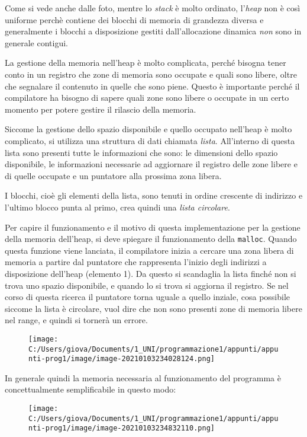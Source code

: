 \documentclass[
]{article}
\begin{document}
Come si vede anche dalle foto, mentre lo \emph{stack} è molto ordinato,
l'\emph{heap} non è così uniforme perchè contiene dei blocchi di memoria
di grandezza diversa e generalmente i blocchi a disposizione gestiti
dall'allocazione dinamica \emph{non} sono in generale contigui.

La gestione della memoria nell'heap è molto complicata, perché bisogna
tener conto in un registro che zone di memoria sono occupate e quali
sono libere, oltre che segnalare il contenuto in quelle che sono piene.
Questo è importante perché il compilatore ha bisogno di sapere quali
zone sono libere o occupate in un certo momento per potere gestire il
rilascio della memoria.

Siccome la gestione dello spazio disponibile e quello occupato nell'heap
è molto complicato, si utilizza una struttura di dati chiamata
\emph{lista}. All'interno di questa lista sono presenti tutte le
informazioni che sono: le dimensioni dello spazio disponibile, le
informazioni necessarie ad aggiornare il registro delle zone libere e di
quelle occupate e un puntatore alla prossima zona libera.

I blocchi, cioè gli elementi della lista, sono tenuti in ordine
crescente di indirizzo e l'ultimo blocco punta al primo, crea quindi una
\emph{lista circolare}.

Per capire il funzionamento e il motivo di questa implementazione per la
gestione della memoria dell'heap, si deve spiegare il funzionamento
della \texttt{malloc}. Quando questa funzione viene lanciata, il
compilatore inizia a cercare una zona libera di memoria a partire dal
puntatore che rappresenta l'inizio degli indirizzi a disposizione
dell'heap (elemento 1). Da questo si scandaglia la lista finché non si
trova uno spazio disponibile, e quando lo si trova si aggiorna il
registro. Se nel corso di questa ricerca il puntatore torna uguale a
quello inziale, cosa possibile siccome la lista è circolare, vuol dire
che non sono presenti zone di memoria libere nel range, e quindi si
tornerà un errore.

\begin{figure}
\centering
\texttt{[image: C:/Users/giova/Documents/1\_UNI/programmazione1/appunti/appunti-prog1/image/image-20210103234028124.png]}
\caption{}
\end{figure}

In generale quindi la memoria necessaria al funzionamento del programma
è concettualmente semplificabile in questo modo:

\begin{figure}
\centering
\texttt{[image: C:/Users/giova/Documents/1\_UNI/programmazione1/appunti/appunti-prog1/image/image-20210103234832110.png]}
\caption{}
\end{figure}
\end{document}
